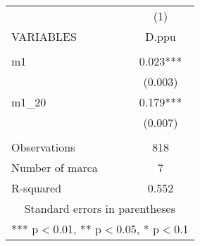 \begin{tabular}{lc} \hline
 & (1) \\
VARIABLES & D.ppu \\ \hline
 &  \\
m1 & 0.023*** \\
 & (0.003) \\
m1\_20 & 0.179*** \\
 & (0.007) \\
 &  \\
Observations & 818 \\
Number of marca & 7 \\
 R-squared & 0.552 \\ \hline
\multicolumn{2}{c}{ Standard errors in parentheses} \\
\multicolumn{2}{c}{ *** p$<$0.01, ** p$<$0.05, * p$<$0.1} \\
\end{tabular}
